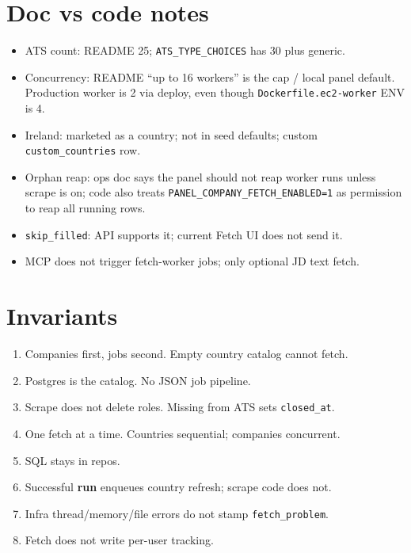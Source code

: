 \documentclass[11pt,a4paper]{article}
\begin{document}
\section{Doc vs code notes}

\begin{itemize}
  \item ATS count: README 25; \texttt{ATS\_TYPE\_CHOICES} has 30 plus generic.
  \item Concurrency: README ``up to 16 workers'' is the cap / local panel
        default. Production worker is 2 via deploy, even though
        \texttt{Dockerfile.ec2-worker} ENV is 4.
  \item Ireland: marketed as a country; not in seed defaults; custom
        \texttt{custom\_countries} row.
  \item Orphan reap: ops doc says the panel should not reap worker runs unless
        scrape is on; code also treats
        \texttt{PANEL\_COMPANY\_FETCH\_ENABLED=1} as permission to reap all
        running rows.
  \item \texttt{skip\_filled}: API supports it; current Fetch UI does not send
        it.
  \item MCP does not trigger fetch-worker jobs; only optional JD text fetch.
\end{itemize}

\section{Invariants}

\begin{enumerate}
  \item Companies first, jobs second. Empty country catalog cannot fetch.
  \item Postgres is the catalog. No JSON job pipeline.
  \item Scrape does not delete roles. Missing from ATS sets
        \texttt{closed\_at}.
  \item One fetch at a time. Countries sequential; companies concurrent.
  \item SQL stays in repos.
  \item Successful \textbf{run} enqueues country refresh; scrape code does not.
  \item Infra thread/memory/file errors do not stamp
        \texttt{fetch\_problem}.
  \item Fetch does not write per-user tracking.
\end{enumerate}
\end{document}
